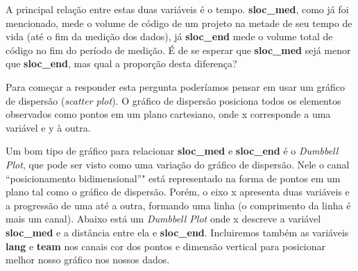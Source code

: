 \documentclass[]{article}
\begin{document}
A principal relação entre estas duas variáveis é o tempo.
\textbf{sloc\_med}, como já foi mencionado, mede o volume de código de
um projeto na metade de seu tempo de vida (até o fim da medição dos
dados), já \textbf{sloc\_end} mede o volume total de código no fim do
período de medição. É de se esperar que \textbf{sloc\_med} sejá menor
que \textbf{sloc\_end}, mas qual a proporção desta diferença?

Para começar a responder esta pergunta poderíamos pensar em usar um
gráfico de dispersão (\emph{scatter plot}). O gráfico de dispersão
posiciona todos os elementos observados como pontos em um plano
cartesiano, onde x corresponde a uma variável e y à outra.

Um bom tipo de gráfico para relacionar \textbf{sloc\_med} e
\textbf{sloc\_end} é o \emph{Dumbbell Plot}, que pode ser visto como uma
variação do gráfico de dispersão. Nele o canal ``posicionamento
bidimensional''" está representado na forma de pontos em um plano tal
como o gráfico de dispersão. Porém, o eixo x apresenta duas variáveis e
a progressão de uma até a outra, formando uma linha (o comprimento da
linha é mais um canal). Abaixo está um \emph{Dumbbell Plot} onde x
descreve a variável \textbf{sloc\_med} e a distância entre ela e
\textbf{sloc\_end}. Incluiremos também as variáveis \textbf{lang} e
\textbf{team} nos canais cor dos pontos e dimensão vertical para
posicionar melhor nosso gráfico nos nossos dados.
\end{document}
